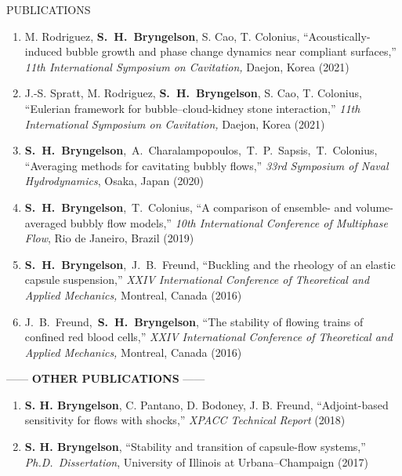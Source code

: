 \documentclass{resume} %
\makeatletter
\newlength{\bibhang}
\newlength{\bibsep}
\newenvironment{bibsection}%
        {\begin{enumerate}{}{%
       \setlength{\leftmargin}{\bibhang}%
       \setlength{\itemindent}{-\leftmargin}%
       \setlength{\itemsep}{\bibsep}%
       \setlength{\parsep}{\z@}%
        \setlength{\topsep}{0pt}}}
        {\end{enumerate}\vspace{-.1\baselineskip}}
\newcommand\SHB{\mbox{\textbf{S. H. Bryngelson}}}
\newcommand\Authors{\mbox{\textbf{S. H. Bryngelson}, J. B. Freund}}
\newcommand\AltAuthors{\mbox{J. B. Freund, \textbf{S. H. Bryngelson}}}
\newcommand\SpencerTim{\mbox{\textbf{S. H. Bryngelson}, T. Colonius}}
\newcommand\SpencerThemis{\mbox{\textbf{S. H. Bryngelson}, A. Charalampopoulos, T. P. Sapsis, T. Colonius}}
\newcommand{\ICTAM}{International Conference of Theoretical and Applied Mechanics}
\makeatother
\begin{document}
\begin{rSection}{{\Large P}UBLICATIONS}
\begin{bibsection}
    \item M. Rodriguez, \SHB, S. Cao, T. Colonius,
    ``Acoustically-induced bubble growth and phase change dynamics near compliant surfaces,''
    \textit{11th International Symposium on Cavitation,} Daejon, Korea (2021)

    \item J.-S. Spratt, M. Rodriguez, \SHB, S. Cao, T. Colonius,
    ``Eulerian framework for bubble--cloud-kidney stone interaction,''
    \textit{11th International Symposium on Cavitation,} Daejon, Korea (2021)

	\item \SpencerThemis, 
    ``Averaging methods for cavitating bubbly flows,''
	\textit{33rd Symposium of Naval Hydrodynamics}, Osaka, Japan (2020)

	\item \SpencerTim, 
    ``A comparison of ensemble- and volume-averaged bubbly flow models,'' 
	\textit{10th International Conference of Multiphase Flow}, Rio de Janeiro, Brazil (2019)

	\item \Authors, 
    ``Buckling and the rheology of an elastic capsule suspension,'' 
	\textit{XXIV \ICTAM,} Montreal, Canada (2016)	

    \item \AltAuthors, 
     ``The stability of flowing trains of confined red blood cells,'' 
	\textit{XXIV \ICTAM,} Montreal, Canada (2016)				
\end{bibsection}

\medskip 

\begin{center}
    ------ \textbf{OTHER PUBLICATIONS} ------
\end{center}

\begin{bibsection}
    \setlength{\itemsep}{\bibsep}%
    \item \textbf{S. H. Bryngelson}, C. Pantano, D. Bodoney, J. B. Freund, 
        ``Adjoint-based sensitivity for flows with shocks,''
	   \textit{XPACC Technical Report}  (2018)

   \item \textbf{S. H. Bryngelson}, 
       ``Stability and transition of capsule-flow systems,''
       \textit{Ph.D.\ Dissertation}, University of Illinois at Urbana--Champaign (2017)
\end{bibsection}

\end{rSection}
\end{document}
